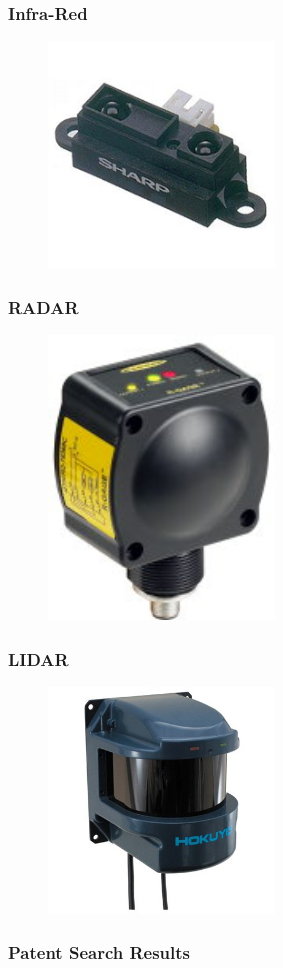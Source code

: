 \documentclass{beamer}
\begin{document}
\begin{frame}
  \frametitle{Infra-Red}
  \begin{figure}
    \centering
    \includegraphics[width=6cm]{ir.jpg}
  \end{figure}
\end{frame}

\begin{frame}
  \frametitle{RADAR}
  \begin{figure}
    \centering
    \includegraphics[width=6cm]{radar.jpg}
  \end{figure}
\end{frame}

\begin{frame}
  \frametitle{LIDAR}
  \begin{figure}
    \centering
    \includegraphics[width=6cm]{laser.jpg}
  \end{figure}
\end{frame}

\begin{frame}
  \frametitle{Patent Search Results}
\end{frame}
\end{document}
